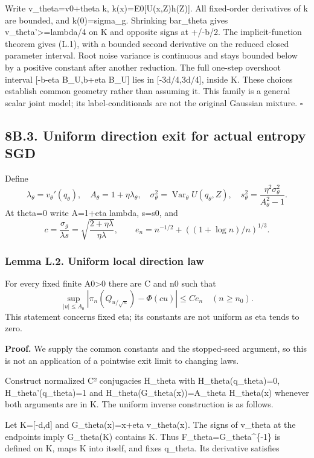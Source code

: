 Write v\_theta=v0+theta k, k(x)=E0{[}U(x,Z)h(Z){]}. All fixed-order
derivatives of k are bounded, and k(0)=sigma\_g. Shrinking bar\_theta
gives v\_theta'\textgreater=lambda/4 on K and opposite signs at +/-b/2.
The implicit-function theorem gives (L.1), with a bounded second
derivative on the reduced closed parameter interval. Root noise variance
is continuous and stays bounded below by a positive constant after
another reduction. The full one-step overshoot interval {[}-b-eta
B\_U,b+eta B\_U{]} lies in {[}-3d/4,3d/4{]}, inside K. These choices
establish common geometry rather than assuming it. This family is a
general scalar joint model; its label-conditionals are not the original
Gaussian mixture. \(\square\)

\subsection{8B.3. Uniform direction exit for actual entropy
SGD}\label{local_prediction-b.3.-uniform-direction-exit-for-actual-entropy-sgd}

Define \[
\lambda_\theta=v_\theta'(q_\theta),\quad A_\theta=1+\eta\lambda_\theta,
\quad \sigma_\theta^2=\operatorname{Var}_\theta U(q_\theta,Z),
\quad s_\theta^2=\frac{\eta^2\sigma_\theta^2}{A_\theta^2-1}.
\] At theta=0 write A=1+eta lambda, s=s0, and \[
c=\frac{\sigma_g}{\lambda s}=\sqrt{\frac{2+\eta\lambda}{\eta\lambda}},
\qquad e_n=n^{-1/2}+((1+\log n)/n)^{1/3}.
\]

\subsubsection{Lemma L.2. Uniform local direction
law}\label{local_prediction-lemma-l.2.-uniform-local-direction-law}

For every fixed finite A0\textgreater0 there are C and n0 such that \[
\sup_{|u|\le A_0}|\pi_n(Q_{u/\sqrt n})-\Phi(cu)|\le C e_n
\quad(n\ge n_0).
\tag{L.2}
\] This statement concerns fixed eta; its constants are not uniform as
eta tends to zero.

\textbf{Proof.} We supply the common constants and the stopped-seed
argument, so this is not an application of a pointwise exit limit to
changing laws.

Construct normalized C² conjugacies H\_theta with H\_theta(q\_theta)=0,
H\_theta'(q\_theta)=1 and H\_theta(G\_theta(x))=A\_theta H\_theta(x)
whenever both arguments are in K. The uniform inverse construction is as
follows.

Let K={[}-d,d{]} and G\_theta(x)=x+eta v\_theta(x). The signs of
v\_theta at the endpoints imply G\_theta(K) contains K. Thus
F\_theta=G\_theta\^{}\{-1\} is defined on K, maps K into itself, and
fixes q\_theta. Its derivative satisfies

